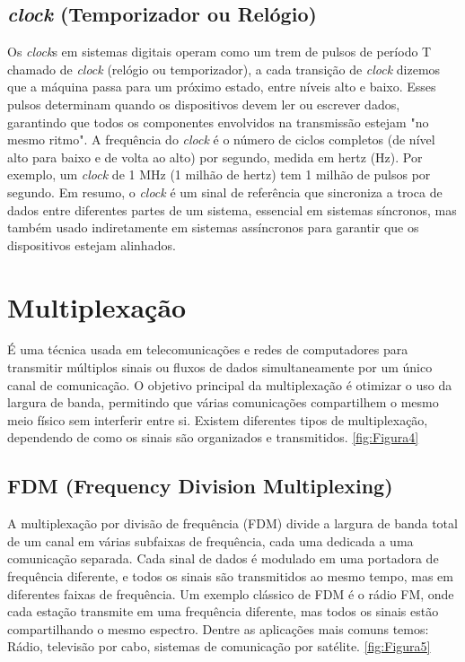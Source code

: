 \documentclass[12pt]{article}
\begin{document}
\subsection{\textit{clock} (Temporizador ou Relógio)}
Os \textit{clock}s em sistemas digitais operam como um trem de pulsos de período T chamado de \textit{clock} (relógio ou temporizador), a cada transição de \textit{clock} dizemos que a máquina passa para um próximo estado, entre níveis alto e baixo. Esses pulsos determinam quando os dispositivos devem ler ou escrever dados, garantindo que todos os componentes envolvidos na transmissão estejam "no mesmo ritmo". A frequência do \textit{clock} é o número de ciclos completos (de nível alto para baixo e de volta ao alto) por segundo, medida em hertz (Hz). Por exemplo, um \textit{clock} de 1 MHz (1 milhão de hertz) tem 1 milhão de pulsos por segundo. Em resumo, o \textit{clock} é um sinal de referência que sincroniza a troca de dados entre diferentes partes de um sistema, essencial em sistemas síncronos, mas também usado indiretamente em sistemas assíncronos para garantir que os dispositivos estejam alinhados.

\section{Multiplexação}
É uma técnica usada em telecomunicações e redes de computadores para transmitir múltiplos sinais ou fluxos de dados simultaneamente por um único canal de comunicação. O objetivo principal da multiplexação é otimizar o uso da largura de banda, permitindo que várias comunicações compartilhem o mesmo meio físico sem interferir entre si. Existem diferentes tipos de multiplexação, dependendo de como os sinais são organizados e transmitidos. \ref{fig:Figura4} 

\subsection{FDM (Frequency Division Multiplexing)}
A multiplexação por divisão de frequência (FDM) divide a largura de banda total de um canal em várias subfaixas de frequência, cada uma dedicada a uma comunicação separada. Cada sinal de dados é modulado em uma portadora de frequência diferente, e todos os sinais são transmitidos ao mesmo tempo, mas em diferentes faixas de frequência. Um exemplo clássico de FDM é o rádio FM, onde cada estação transmite em uma frequência diferente, mas todos os sinais estão compartilhando o mesmo espectro. Dentre as aplicações mais comuns temos: Rádio, televisão por cabo, sistemas de comunicação por satélite. \ref{fig:Figura5} \cite{pinto_albuquerque}
\end{document}
